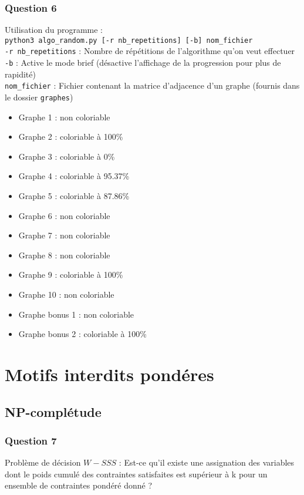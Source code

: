 \documentclass{report}
\begin{document}
\subsubsection*{Question 6}

Utilisation du programme :\\
\verb|python3 algo_random.py [-r nb_repetitions] [-b] nom_fichier|\\
\verb|-r nb_repetitions| : Nombre de répétitions de l'algorithme qu'on veut effectuer\\
\verb|-b| : Active le mode brief (désactive l'affichage de la progression pour plus de rapidité)\\
\verb|nom_fichier| : Fichier contenant la matrice d'adjacence d'un graphe (fournis dans le dossier \verb|graphes|)\\
\begin{itemize}
\item Graphe 1 : non coloriable
\item Graphe 2 : coloriable à 100\% 
\item Graphe 3 : coloriable à 0\% 
\item Graphe 4 : coloriable à 95.37\% 
\item Graphe 5 : coloriable à 87.86\% 
\item Graphe 6 : non coloriable
\item Graphe 7 : non coloriable
\item Graphe 8 : non coloriable
\item Graphe 9 : coloriable à 100\% 
\item Graphe 10 : non coloriable
\item Graphe bonus 1 : non coloriable
\item Graphe bonus 2 : coloriable à 100\%
\end{itemize}

\section*{Motifs interdits pondéres}

\subsection*{NP-complétude}

\subsubsection*{Question 7}

Problème de décision $W-SSS$ : Est-ce qu'il existe une assignation des variables dont le poids cumulé des contraintes satisfaites est supérieur à k pour un ensemble de contraintes pondéré donné ?
\end{document}
